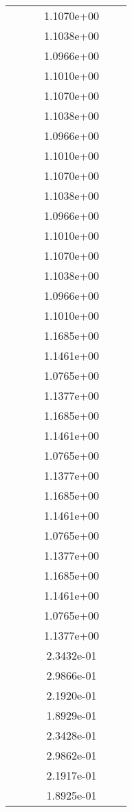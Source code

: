 \begin{xltabular}{\textwidth}{r|rS[table-format=1.3e+2]S[table-format=1.4e+2]S[table-format=1.4e+2]S[table-format=-1.5]}
&  &  & 1.1070e+00 & & \\
&  &  & 1.1038e+00 & & \\
&  &  & 1.0966e+00 & & \\
&  &  & 1.1010e+00 & & \\
&  &  & 1.1070e+00 & & \\
&  &  & 1.1038e+00 & & \\
&  &  & 1.0966e+00 & & \\
&  &  & 1.1010e+00 & & \\
&  &  & 1.1070e+00 & & \\
&  &  & 1.1038e+00 & & \\
&  &  & 1.0966e+00 & & \\
&  &  & 1.1010e+00 & & \\
&  &  & 1.1070e+00 & & \\
&  &  & 1.1038e+00 & & \\
&  &  & 1.0966e+00 & & \\
&  &  & 1.1010e+00 & & \\
&  &  & 1.1685e+00 & & \\
&  &  & 1.1461e+00 & & \\
&  &  & 1.0765e+00 & & \\
&  &  & 1.1377e+00 & & \\
&  &  & 1.1685e+00 & & \\
&  &  & 1.1461e+00 & & \\
&  &  & 1.0765e+00 & & \\
&  &  & 1.1377e+00 & & \\
&  &  & 1.1685e+00 & & \\
&  &  & 1.1461e+00 & & \\
&  &  & 1.0765e+00 & & \\
&  &  & 1.1377e+00 & & \\
&  &  & 1.1685e+00 & & \\
&  &  & 1.1461e+00 & & \\
&  &  & 1.0765e+00 & & \\
&  &  & 1.1377e+00 & & \\
&  &  & 2.3432e-01 & & \\
&  &  & 2.9866e-01 & & \\
&  &  & 2.1920e-01 & & \\
&  &  & 1.8929e-01 & & \\
&  &  & 2.3428e-01 & & \\
&  &  & 2.9862e-01 & & \\
&  &  & 2.1917e-01 & & \\
&  &  & 1.8925e-01 & & \\

\end{xltabular}
